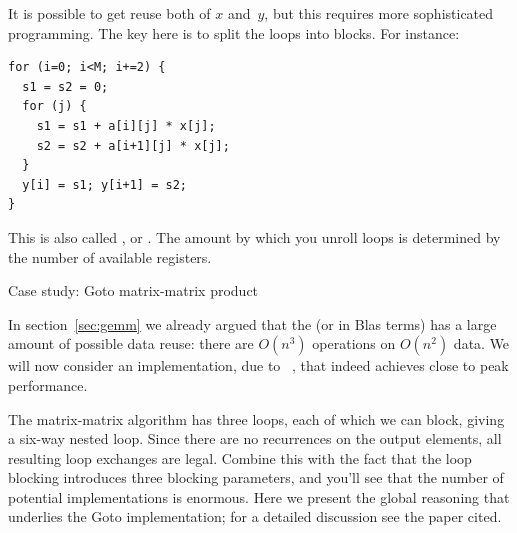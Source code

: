It is possible to get reuse both of $x$ and~$y$, but this requires
more sophisticated programming. The key here is to split the loops into
blocks. For instance:
\begin{verbatim}
for (i=0; i<M; i+=2) {
  s1 = s2 = 0;
  for (j) {
    s1 = s1 + a[i][j] * x[j];
    s2 = s2 + a[i+1][j] * x[j];
  }
  y[i] = s1; y[i+1] = s2;
}
\end{verbatim}
This is also called ,
or . The amount by which you unroll
loops is determined by the number of available registers.

 {Case study: Goto matrix-matrix product}
\label{sec:goto-gemm}

In section~\ref{sec:gemm} we already argued that the  (or  in Blas terms) has a large amount of
possible data reuse: there are $O(n^3)$ operations on $O(n^2)$ data.
We will now consider an implementation, due
to ~\cite{GotoGeijn:2008:Anatomy}, that
indeed achieves close to peak performance.

The matrix-matrix algorithm has three loops, each of which we can block,
giving a six-way nested loop.
Since there are no recurrences on the output elements, all resulting
loop exchanges are legal. Combine this with the fact that the loop blocking
introduces three blocking parameters, and you'll see that the number of
potential implementations is enormous. Here we present the global reasoning
that underlies the Goto implementation; for a detailed discussion see the paper cited.

